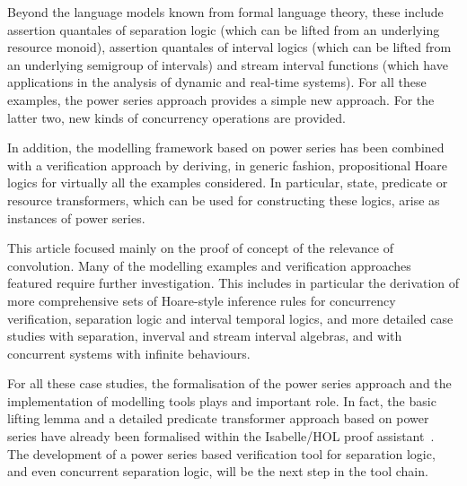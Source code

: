 \documentclass[12pt]{article}
\theoremstyle{definition}
\begin{document}
Beyond the language models known from formal language theory, these
include assertion quantales of separation logic (which can be lifted
from an underlying resource monoid), assertion quantales of interval
logics (which can be lifted from an underlying semigroup of intervals)
and stream interval functions (which have applications in the analysis
of dynamic and real-time systems). For all these examples, the power
series approach provides a simple new approach. For the latter two,
new kinds of concurrency operations are provided.

In addition, the modelling framework based on power series has been
combined with a verification approach by deriving, in generic fashion,
propositional Hoare logics for virtually all the examples
considered. In particular, state, predicate or resource transformers,
which can be used for constructing these logics, arise as instances of
power series.

This article focused mainly on the proof of concept of the relevance
of convolution. Many of the modelling examples and verification
approaches featured require further investigation. This includes in
particular the derivation of more comprehensive sets of Hoare-style
inference rules for concurrency verification, separation logic and
interval temporal logics, and more detailed case studies with
separation, inverval and stream interval algebras, and with concurrent
systems with infinite behaviours.

For all these case studies, the formalisation of the power series
approach and the implementation of modelling tools plays and important
role.  In fact, the basic lifting lemma and a detailed predicate
transformer approach based on power series have already been
formalised within the Isabelle/HOL proof assistant~\cite{NPW02}.  The
development of a power series based verification tool for separation
logic, and even concurrent separation logic, will be the next step in
the tool chain.



\end{document}
